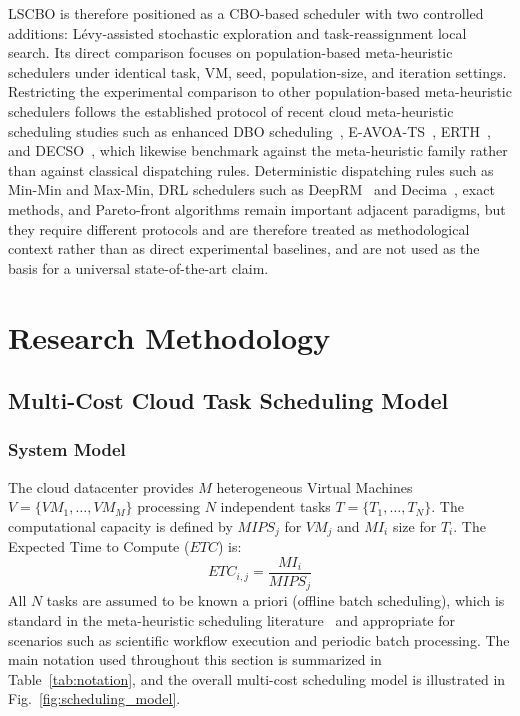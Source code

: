 \documentclass[pdflatex,onecolumn,sn-mathphys-num]{sn-jnl}
\begin{document}
LSCBO is therefore positioned as a CBO-based scheduler with two controlled additions: L\'{e}vy-assisted stochastic exploration and task-reassignment local search. Its direct comparison focuses on population-based meta-heuristic schedulers under identical task, VM, seed, population-size, and iteration settings. Restricting the experimental comparison to other population-based meta-heuristic schedulers follows the established protocol of recent cloud meta-heuristic scheduling studies such as enhanced DBO scheduling~\cite{Xie2024}, E-AVOA-TS~\cite{Ghafari2023}, ERTH~\cite{Ferahtia2023,Qin2024}, and DECSO~\cite{Gunduz2025}, which likewise benchmark against the meta-heuristic family rather than against classical dispatching rules. Deterministic dispatching rules such as Min-Min and Max-Min, DRL schedulers such as DeepRM~\cite{Mao2016} and Decima~\cite{Mao2019}, exact methods, and Pareto-front algorithms remain important adjacent paradigms, but they require different protocols and are therefore treated as methodological context rather than as direct experimental baselines, and are not used as the basis for a universal state-of-the-art claim.

\section{Research Methodology}\label{sec3}

\subsection{Multi-Cost Cloud Task Scheduling Model}\label{sec4}

\subsubsection{System Model}
The cloud datacenter provides $M$ heterogeneous Virtual Machines $V = \{VM_1, \ldots, VM_M\}$ processing $N$ independent tasks $T = \{T_1, \ldots, T_N\}$. The computational capacity is defined by $MIPS_j$ for $VM_j$ and $MI_i$ size for $T_i$. The Expected Time to Compute ($ETC$) is:
\begin{equation}
ETC_{i,j} = \frac{MI_i}{MIPS_j}
\end{equation}
All $N$ tasks are assumed to be known a priori (offline batch scheduling), which is standard in the meta-heuristic scheduling literature~\cite{Braun2001} and appropriate for scenarios such as scientific workflow execution and periodic batch processing. The main notation used throughout this section is summarized in Table~\ref{tab:notation}, and the overall multi-cost scheduling model is illustrated in Fig.~\ref{fig:scheduling_model}.
\end{document}
